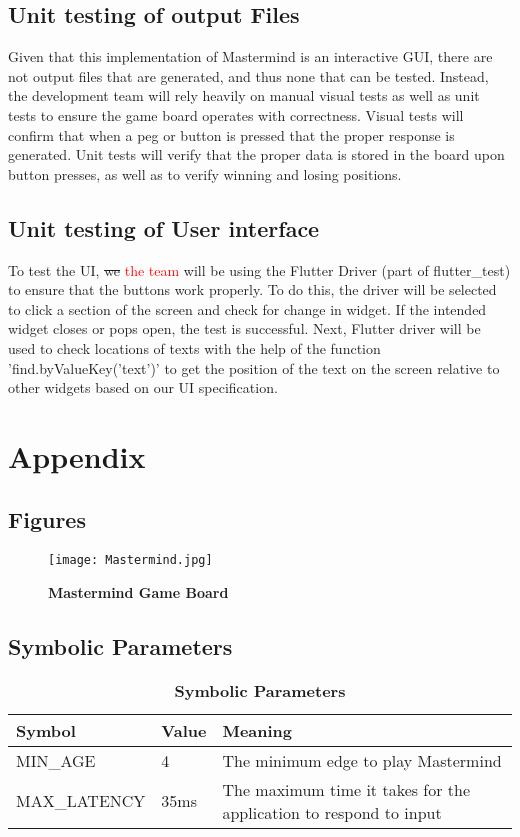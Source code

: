 \documentclass[12pt, titlepage]{article}
\begin{document}
		
\subsection{Unit testing of output Files}
Given that this implementation of Mastermind is an interactive GUI, there are not output files that are generated, and thus none that can be tested. Instead, the development team will rely heavily on manual visual tests as well as unit tests to ensure the game board operates with correctness. Visual tests will confirm that when a peg or button is pressed that the proper response is generated. Unit tests will verify that the proper data is stored in the board upon button presses, as well as to verify winning and losing positions.

\subsection{Unit testing of User interface}
To test the UI, \sout{we} \textcolor{red}{the team} will be using the Flutter Driver (part of flutter\_test) to ensure that the buttons work properly. To do this, the driver will be selected to click a section of the screen and check for change in widget. If the intended widget closes or pops open, the test is successful. Next, Flutter driver will be used to check locations of texts with the help of the function 'find.byValueKey('text')' to get the position of the text on the screen relative to other widgets based on our UI specification.


\newpage

\section{Appendix}

\subsection{Figures}
\begin{figure}[H]
\texttt{[image: Mastermind.jpg]}
\caption{\bf Mastermind Game Board}
\end{figure}

\subsection{Symbolic Parameters}

\begin{table}[H]
\caption{\bf Symbolic Parameters}
\begin{tabular}{ |p{4cm}|p{3cm}|p{6cm}|  }
\hline
 \textbf{Symbol} & Value & Meaning\\
 \hline 
 MIN\_AGE & 4 & The minimum edge to play Mastermind \\
\hline
MAX\_LATENCY & 35ms & The maximum time it takes for the application to respond to input \\

\hline
\end{tabular}
\end{table}
\end{document}
